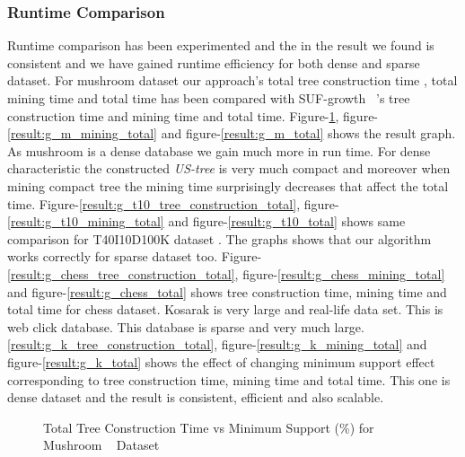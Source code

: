 \documentclass[conference]{IEEEtran}
\begin{document}
\subsubsection{Runtime Comparison}
    Runtime comparison has been experimented and the in the result we found is consistent and we have gained runtime efficiency for both dense and sparse dataset. For mushroom dataset our approach's total tree construction time , total mining time and total time has been compared with SUF-growth ~\cite{suf_growth}'s tree construction time and mining time and total time. Figure-\ref{result:g_m_tree_construction_total}, figure-\ref{result:g_m_mining_total} and figure-\ref{result:g_m_total} shows the result graph. As mushroom is a dense database we gain much more in run time. For dense characteristic the constructed \emph{US-tree} is very much compact and moreover when mining compact tree the mining time surprisingly decreases that affect the total time. Figure-\ref{result:g_t10_tree_construction_total}, figure-\ref{result:g_t10_mining_total} and figure-\ref{result:g_t10_total} shows same comparison for T40I10D100K dataset . The graphs shows that our algorithm works correctly for sparse dataset too. Figure-\ref{result:g_chess_tree_construction_total}, figure-\ref{result:g_chess_mining_total} and figure-\ref{result:g_chess_total} shows tree construction time, mining time and total time for chess dataset. Kosarak is very large and real-life data set. This is web click database. This database is sparse and very much large. \ref{result:g_k_tree_construction_total}, figure-\ref{result:g_k_mining_total} and figure-\ref{result:g_k_total} shows the effect of changing minimum support effect corresponding to tree construction time, mining time and total time. This one is dense dataset and the result is consistent, efficient and also scalable.
            \begin{figure}[h]
            \centering
                
            \caption{Total Tree Construction Time vs Minimum Support (\%) for Mushroom ~\cite{dataset} Dataset }
            \label{result:g_m_tree_construction_total}
            \end{figure}
            
\end{document}
